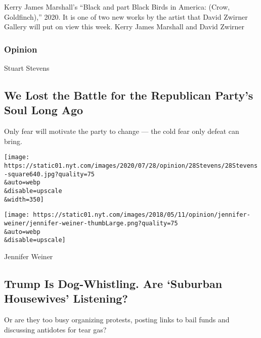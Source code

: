Kerry James Marshall's ``Black and part Black Birds in America: (Crow,
Goldfinch),'' 2020. It is one of two new works by the artist that David
Zwirner Gallery will put on view this week. Kerry James Marshall and
David Zwirner

\href{https://www.nytimes.com/section/opinion?pagetype=Homepage\&action=click\&module=Opinion}{}

\hypertarget{opinion}{%
\subsubsection{Opinion}\label{opinion}}

\href{/2020/07/29/opinion/trump-republican-party-racism.html}{}

Stuart Stevens

\hypertarget{we-lost-the-battle-for-the-republican-partys-soul-long-ago}{%
\subsection{We Lost the Battle for the Republican Party's Soul Long
Ago}\label{we-lost-the-battle-for-the-republican-partys-soul-long-ago}}

Only fear will motivate the party to change --- the cold fear only
defeat can bring.

\href{/2020/07/29/opinion/trump-republican-party-racism.html}{}

\texttt{[image: https://static01.nyt.com/images/2020/07/28/opinion/28Stevens/28Stevens-square640.jpg?quality=75\\\&auto=webp\\\&disable=upscale\\\&width=350]}

\href{/2020/07/28/opinion/trump-white-women.html}{}

\texttt{[image: https://static01.nyt.com/images/2018/05/11/opinion/jennifer-weiner/jennifer-weiner-thumbLarge.png?quality=75\\\&auto=webp\\\&disable=upscale]}

Jennifer Weiner

\hypertarget{trump-is-dog-whistling-are-suburban-housewives-listening}{%
\subsection{Trump Is Dog-Whistling. Are `Suburban Housewives'
Listening?}\label{trump-is-dog-whistling-are-suburban-housewives-listening}}

Or are they too busy organizing protests, posting links to bail funds
and discussing antidotes for tear gas?

\href{/2020/07/29/opinion/amazon-union-congress-antitrust.html}{}


